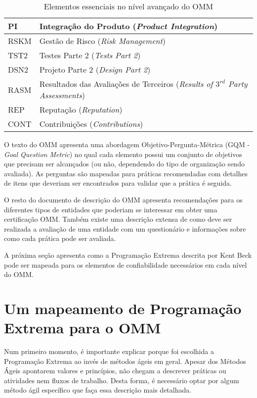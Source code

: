 \begin{table}
  \begin{tabular}{|p{2cm}|p{14cm}|}
    \hline
    PI & Integração do Produto
    (\textit{Product Integration}) \\
    \hline
    RSKM & Gestão de Risco
    (\textit{Risk Management}) \\
    \hline
    TST2 & Testes Parte 2
    (\textit{Tests Part 2}) \\
    \hline
    DSN2 & Projeto Parte 2
    (\textit{Design Part 2}) \\
    \hline
    RASM & Resultados das Avaliações de Terceiros
    (\textit{Results of $3^{rd}$ Party Assessments}) \\
    \hline
    REP & Reputação
    (\textit{Reputation}) \\
    \hline
    CONT & Contribuições
    (\textit{Contributions}) \\
    \hline
  \end{tabular}
  \caption{Elementos essenciais no nível avançado do OMM}
  \label{tab:omm-advanced}
\end{table}

O texto do OMM apresenta uma abordagem Objetivo-Pergunta-Métrica (GQM
- \textit{Goal Question Metric}) no qual cada elemento possui um
conjunto de objetivos que precisam ser alcançados (ou não, dependendo
do tipo de organização sendo avaliada). As perguntas são mapeadas para
práticas recomendadas com detalhes de itens que deveriam ser
encontrados para validar que a prática é seguida.

O resto do documento de descrição do OMM apresenta recomendações para
os diferentes tipos de entidades que poderiam se interessar em obter
uma certificação OMM. Também existe uma descrição extensa de como deve
ser realizada a avaliação de uma entidade com um questionário e
informações sobre como cada prática pode ser avaliada.

A próxima seção apresenta como a Programação Extrema descrita por Kent
Beck pode ser mapeada para os elementos de confiabilidade necessários
em cada nível do OMM.

\section{Um mapeamento de Programação Extrema para o OMM}
\label{sec:xp-em-omm}

Num primeiro momento, é importante explicar porque foi escolhida a
Programação Extrema ao invés de métodos ágeis em geral. Apesar dos
Métodos Ágeis apontarem valores e princípios, não chegam a descrever
práticas ou atividades nem fluxos de trabalho. Desta forma, é
necessário optar por algum método ágil específico que faça essa
descrição mais detalhada.

